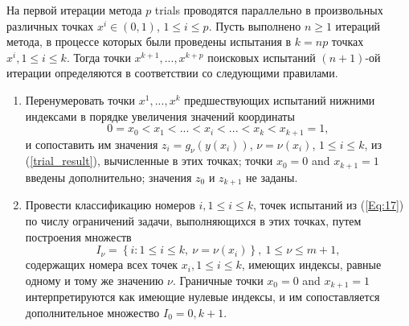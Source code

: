 \documentclass[
11pt,%
tightenlines,%
twoside,%
onecolumn,%
nofloats,%
nobibnotes,%
nofootinbib,%
superscriptaddress,%
noshowpacs,%
centertags]%
{revtex4}
\begin{document}
На первой итерации метода $p$ trials проводятся параллельно в произвольных различных точках $x^i\in(0,1)$, $1\leq i \leq p$.
Пусть выполнено $n\geq 1$  итераций метода, в процессе которых были проведены испытания в $k=np$ точках $x^i, 1\leq i \leq k$. Тогда точки $x^{k+1},...,x^{k+p}$ поисковых испытаний $(n+1)$-ой итерации определяются в соответствии со следующими правилами.

\begin{enumerate}
\item 
Перенумеровать точки $x^1,...,x^k$ предшествующих испытаний нижними индексами в порядке увеличения значений координаты
\begin{equation}\label{Eq:17}
0=x_0<x_1<...<x_i<...<x_k<x_{k+1}=1,
\end{equation}
и сопоставить им значения $z_i=g_\nu(y(x_i))$, $\nu=\nu(x_i)$, $1 \leq i \leq k$, из (\ref{trial_result}), вычисленные в этих точках; точки $x_0=0$ and $x_{k+1}=1$ введены дополнительно; значения $z_0$ и $z_{k+1}$ не заданы.
\item
Провести классификацию номеров  $i,1\leq i \leq k$, точек испытаний из  (\ref{Eq:17}) по числу ограничений задачи, выполняющихся в этих точках, путем построения множеств
\begin{equation}\label{Eq:18}
I_\nu = \left\{i: 1 \leq i \leq k,\ \nu = \nu(x_i)\right\},\ 1 \leq \nu \leq m+1,
\end{equation}
содержащих номера всех точек  $x_i,1\leq i \leq k$, имеющих индексы, равные одному и тому же значению $\nu$. Граничные точки $x_0=0$ and $x_{k+1}=1$ интерпретируются как имеющие нулевые индексы, и им сопоставляется дополнительное множество $I_0={0,k+1}$. 


\end{enumerate}
\end{document}
